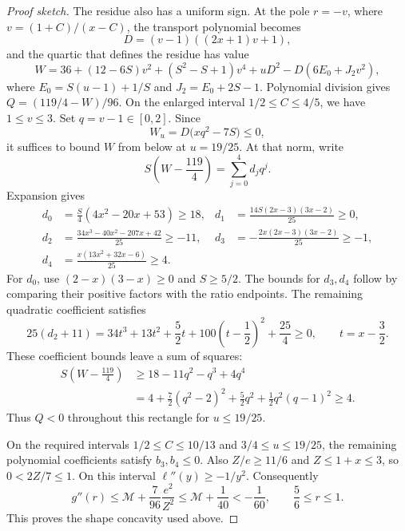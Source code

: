 \begin{proof}[Proof sketch]
The residue also has a uniform sign. At the pole $r=-v$, where
$v=(1+C)/(x-C)$, the transport polynomial becomes
\[
 D=(v-1)((2x+1)v+1),
\]
and the quartic that defines the residue has value
\[
 W=36+(12-6S)v^2+(S^2-S+1)v^4+uD^2-D(6E_0+J_2v^2),
\]
where $E_0=S(u-1)+1/S$ and $J_2=E_0+2S-1$.
Polynomial division gives $Q=(119/4-W)/96$.
On the enlarged interval $1/2\le C\le4/5$, we have $1\le v\le3$.
Set $q=v-1\in[0,2]$. Since
\[
 W_u=D\bigl(xq^2-7S\bigr)\le0,
\]
it suffices to bound $W$ from below at $u=19/25$.
At that norm, write
\[
 S\left(W-\frac{119}4\right)=\sum_{j=0}^4d_jq^j.
\]
Expansion gives
\begin{align*}
 d_0&=\frac S4(4x^2-20x+53)\ge18,&
 d_1&=\frac{14S(2x-3)(3x-2)}{25}\ge0,\\
 d_2&=\frac{34x^3-40x^2-207x+42}{25}\ge-11,&
 d_3&=-\frac{2x(2x-3)(3x-2)}{25}\ge-1,\\
 d_4&=\frac{x(13x^2+32x-6)}{25}\ge4.
\end{align*}
For $d_0$, use $(2-x)(3-x)\ge0$ and $S\ge5/2$.
The bounds for $d_3,d_4$ follow by comparing their positive factors with
the ratio endpoints. The remaining quadratic coefficient satisfies
\[
 25(d_2+11)=34t^3+13t^2+\frac52t
                  +100\left(t-\frac12\right)^2+\frac{25}4\ge0,
 \qquad t=x-\frac32.
\]
These coefficient bounds leave a sum of squares:
\begin{align*}
 S\left(W-\frac{119}4\right)
 &\ge18-11q^2-q^3+4q^4\\
 &=4+\frac72(q^2-2)^2+\frac52q^2+\frac12q^2(q-1)^2\ge4.
\end{align*}
Thus $Q<0$ throughout this rectangle for $u\le19/25$.

On the required intervals $1/2\le C\le10/13$ and $3/4\le u\le19/25$,
the remaining polynomial coefficients satisfy $b_3,b_4\le0$.
Also $Z/e\ge11/6$ and $Z\le1+x\le3$, so $0<2Z/7\le1$.
On this interval $\ell''(y)\ge-1/y^2$.
Consequently
\[
 g''(r)\le\mathcal M+\frac7{96}\frac{e^2}{Z^2}
          \le\mathcal M+\frac1{40}<-\frac1{60},
 \qquad \frac56\le r\le1.
\]
This proves the shape concavity used above.


\end{proof}
